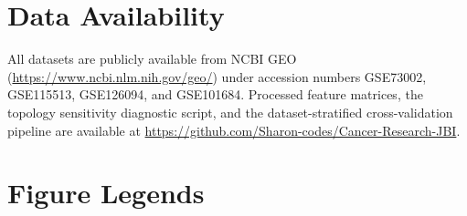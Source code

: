 \documentclass[12pt]{article}
\begin{document}
\section*{Data Availability}

All datasets are publicly available from NCBI GEO
(\url{https://www.ncbi.nlm.nih.gov/geo/}) under accession numbers
GSE73002, GSE115513, GSE126094, and GSE101684. Processed feature
matrices, the topology sensitivity diagnostic script, and the
dataset-stratified cross-validation pipeline are available at
\url{https://github.com/Sharon-codes/Cancer-Research-JBI}.



\newpage
\section*{Figure Legends}
\end{document}
